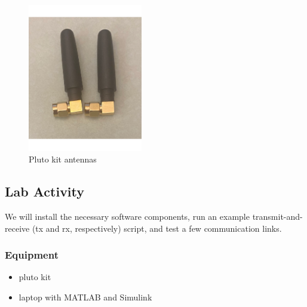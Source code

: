 \begin{figure}
    \centering
    \includegraphics[scale=0.5, width=50mm]{images/pluto_antennas.pdf}
    \caption{Pluto kit antennas}
    \label{fig:ant}
\end{figure}

\newpage
\subsection{Lab Activity}
We will install the necessary software components, run an example transmit-and-receive (tx and rx, respectively) script, and test a few communication links.

\subsubsection{Equipment}
\begin{itemize}
    \item pluto kit
    \item laptop with MATLAB and Simulink
\end{itemize}

